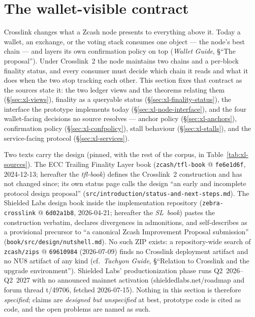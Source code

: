 \documentclass[11pt,a4paper]{article}
\theoremstyle{definition}
\begin{document}
\section{The wallet-visible contract}\label{sec:xl-contract}

Crosslink changes what a Zcash node presents to everything above it. Today a
wallet, an exchange, or the voting stack consumes one object --- the node's
best chain --- and layers its own confirmation policy on top (\emph{Wallet
Guide}, \S``The proposal''). Under Crosslink~2 the node maintains two chains
and a per-block finality status, and every consumer must decide which chain
it reads and what it does when the two stop tracking each other. This
section fixes that contract as the sources state it: the two ledger views
and the theorems relating them (\S\ref{sec:xl-views}), finality as a
queryable status (\S\ref{sec:xl-finality-status}), the interface the
prototype implements today (\S\ref{sec:xl-node-interface}), and the four
wallet-facing decisions no source resolves --- anchor policy
(\S\ref{sec:xl-anchors}), confirmation policy (\S\ref{sec:xl-confpolicy}),
stall behaviour (\S\ref{sec:xl-stalls}), and the service-facing protocol
(\S\ref{sec:xl-services}).

Two texts carry the design (pinned, with the rest of the corpus, in
Table~\ref{tab:xl-sources}). The ECC Trailing Finality Layer book
(\texttt{zcash/tfl-book} @ \texttt{fe6e1d6f}, 2024-12-13; hereafter the
\emph{tfl-book}) defines the Crosslink~2 construction and has not changed
since; its own status page calls the design ``an early and incomplete
protocol design proposal'' (\texttt{src/introduction/status-and-next-steps.md}).
The Shielded Labs design book inside the implementation repository
(\texttt{zebra-crosslink} @ \texttt{6d02a1b8}, 2026-04-21; hereafter the
\emph{SL~book}) pastes the construction verbatim, declares divergences in
admonitions, and self-describes as a provisional precursor to ``a canonical
Zcash Improvement Proposal submission'' (\texttt{book/src/design/nutshell.md}).
No such ZIP exists: a repository-wide search of \texttt{zcash/zips} @
\texttt{69610984} (2026-07-09) finds no Crosslink deployment artifact and no
NU8 artifact of any kind (cf.\ \emph{Tachyon Guide}, \S``Relation to
Crosslink and the upgrade environment''). Shielded Labs' productionization
phase runs Q2~2026--Q2~2027 with no announced mainnet activation
(shieldedlabs.net/roadmap and forum thread t/49706, fetched 2026-07-15).
Nothing in this section is therefore \emph{specified}; claims are
\emph{designed but unspecified} at best, prototype code is cited as code,
and the open problems are named as such.
\end{document}
